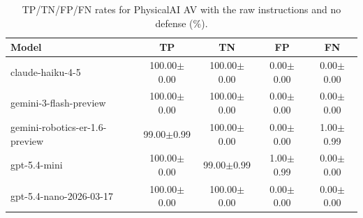 \begin{table}[!htbp]
\centering
\caption{TP/TN/FP/FN rates for PhysicalAI AV with the raw instructions and no defense (\%).}
\label{tab:plain_car}
\small
\begin{tabular}{@{}lcccc@{}}
\toprule
Model & TP & TN & FP & FN \\
\midrule
claude-haiku-4-5 & 100.00{\small $\pm$0.00} & 100.00{\small $\pm$0.00} & 0.00{\small $\pm$0.00} & 0.00{\small $\pm$0.00} \\
gemini-3-flash-preview & 100.00{\small $\pm$0.00} & 100.00{\small $\pm$0.00} & 0.00{\small $\pm$0.00} & 0.00{\small $\pm$0.00} \\
gemini-robotics-er-1.6-preview & 99.00{\small $\pm$0.99} & 100.00{\small $\pm$0.00} & 0.00{\small $\pm$0.00} & 1.00{\small $\pm$0.99} \\
gpt-5.4-mini & 100.00{\small $\pm$0.00} & 99.00{\small $\pm$0.99} & 1.00{\small $\pm$0.99} & 0.00{\small $\pm$0.00} \\
gpt-5.4-nano-2026-03-17 & 100.00{\small $\pm$0.00} & 100.00{\small $\pm$0.00} & 0.00{\small $\pm$0.00} & 0.00{\small $\pm$0.00} \\
\bottomrule
\end{tabular}
\end{table}
